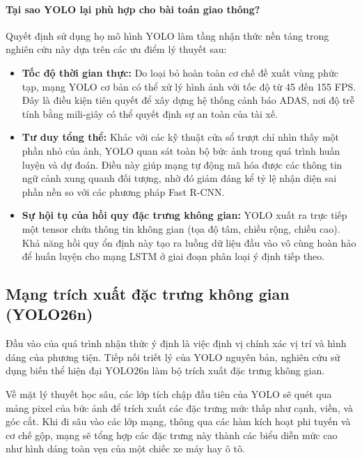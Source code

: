 	\paragraph{Tại sao YOLO lại phù hợp cho bài toán giao thông?}
	Quyết định sử dụng họ mô hình YOLO làm tầng nhận thức nền tảng trong nghiên cứu này dựa trên các ưu điểm lý thuyết sau:
	\begin{itemize}
		\item \textbf{Tốc độ thời gian thực:} Do loại bỏ hoàn toàn cơ chế đề xuất vùng phức tạp, mạng YOLO cơ bản có thể xử lý hình ảnh với tốc độ từ 45 đến 155 FPS\cite{Redmon2015YouOL}. Đây là điều kiện tiên quyết để xây dựng hệ thống cảnh báo ADAS, nơi độ trễ tính bằng mili-giây có thể quyết định sự an toàn của tài xế.
		\item \textbf{Tư duy tổng thể:} Khác với các kỹ thuật cửa sổ trượt chỉ nhìn thấy một phần nhỏ của ảnh, YOLO quan sát toàn bộ bức ảnh trong quá trình huấn luyện và dự đoán\cite{Redmon2015YouOL}. Điều này giúp mạng tự động mã hóa được các thông tin ngữ cảnh xung quanh đối tượng, nhờ đó giảm đáng kể tỷ lệ nhận diện sai phần nền so với các phương pháp Fast R-CNN\cite{Redmon2015YouOL}.
		\item \textbf{Sự hội tụ của hồi quy đặc trưng không gian:} YOLO xuất ra trực tiếp một tensor chứa thông tin không gian (tọa độ tâm, chiều rộng, chiều cao)\cite{Redmon2015YouOL}. Khả năng hồi quy ổn định này tạo ra luồng dữ liệu đầu vào vô cùng hoàn hảo để huấn luyện cho mạng LSTM ở giai đoạn phân loại ý định tiếp theo.
	\end{itemize}
	
	\subsection{Mạng trích xuất đặc trưng không gian (YOLO26n)}
	
	Đầu vào của quá trình nhận thức ý định là việc định vị chính xác vị trí và hình dáng của phương tiện. Tiếp nối triết lý của YOLO nguyên bản, nghiên cứu sử dụng biến thể hiện đại YOLO26n làm bộ trích xuất đặc trưng không gian.
	
	Về mặt lý thuyết học sâu, các lớp tích chập đầu tiên của YOLO sẽ quét qua mảng pixel của bức ảnh để trích xuất các đặc trưng mức thấp như cạnh, viền, và góc cắt. Khi đi sâu vào các lớp mạng, thông qua các hàm kích hoạt phi tuyến và cơ chế gộp, mạng sẽ tổng hợp các đặc trưng này thành các biểu diễn mức cao như hình dáng toàn vẹn của một chiếc xe máy hay ô tô.
	
